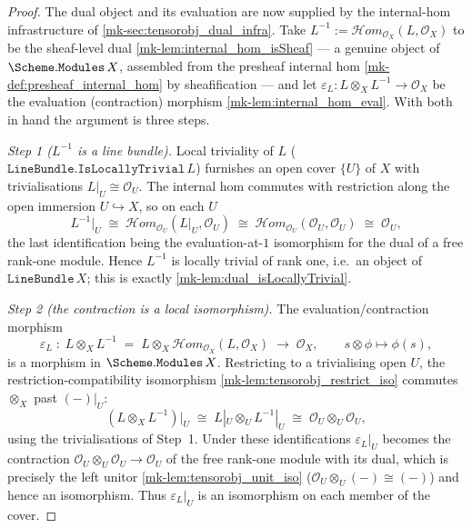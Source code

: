 \begin{proof}
  The dual object and its evaluation are now supplied by the internal-hom
  infrastructure of \ref{mk-sec:tensorobj_dual_infra}. Take
  \(L^{-1} := \mathcal{H}om_{\mathcal{O}_X}(L, \mathcal{O}_X)\) to be the
  sheaf-level dual \ref{mk-lem:internal_hom_isSheaf} --- a genuine object of
  \(\Scheme.\mathtt{Modules}\,X\), assembled from the presheaf internal hom
  \ref{mk-def:presheaf_internal_hom} by sheafification --- and let
  \(\varepsilon_L : L \otimes_X L^{-1} \to \mathcal{O}_X\) be the evaluation
  (contraction) morphism \ref{mk-lem:internal_hom_eval}. With both in hand the
  argument is three steps.

  \emph{Step 1 (\(L^{-1}\) is a line bundle).} Local triviality of \(L\)
  (\(\mathtt{LineBundle.IsLocallyTrivial}\,L\)) furnishes an open cover \(\{U\}\) of
  \(X\) with trivialisations \(L|_U \cong \mathcal{O}_U\). The internal hom commutes
  with restriction along the open immersion \(U \hookrightarrow X\), so on each \(U\)
  \[
    L^{-1}\big|_U \;\cong\; \mathcal{H}om_{\mathcal{O}_U}(L|_U, \mathcal{O}_U)
                 \;\cong\; \mathcal{H}om_{\mathcal{O}_U}(\mathcal{O}_U, \mathcal{O}_U)
                 \;\cong\; \mathcal{O}_U ,
  \]
  the last identification being the evaluation-at-\(1\) isomorphism for the dual of a
  free rank-one module. Hence \(L^{-1}\) is locally trivial of rank one, i.e.\ an
  object of \(\texttt{LineBundle}\,X\); this is exactly
  \ref{mk-lem:dual_isLocallyTrivial}.

  \emph{Step 2 (the contraction is a local isomorphism).} The evaluation/contraction
  morphism
  \[
    \varepsilon_L \;\colon\; L \otimes_X L^{-1}
      \;=\; L \otimes_X \mathcal{H}om_{\mathcal{O}_X}(L, \mathcal{O}_X)
      \;\longrightarrow\; \mathcal{O}_X,
    \qquad s \otimes \phi \longmapsto \phi(s),
  \]
  is a morphism in \(\Scheme.\mathtt{Modules}\,X\). Restricting to a trivialising
  open \(U\), the restriction-compatibility isomorphism \ref{mk-lem:tensorobj_restrict_iso}
  commutes \(\otimes_X\) past \((-)|_U\):
  \[
    (L \otimes_X L^{-1})\big|_U \;\cong\; L|_U \otimes_U L^{-1}|_U
      \;\cong\; \mathcal{O}_U \otimes_U \mathcal{O}_U ,
  \]
  using the trivialisations of Step~1. Under these identifications \(\varepsilon_L|_U\)
  becomes the contraction \(\mathcal{O}_U \otimes_U \mathcal{O}_U \to \mathcal{O}_U\) of
  the free rank-one module with its dual, which is precisely the left unitor
  \ref{mk-lem:tensorobj_unit_iso} (\(\mathcal{O}_U \otimes_U (-) \cong (-)\)) and hence an
  isomorphism. Thus \(\varepsilon_L|_U\) is an isomorphism on each member of the cover.


\end{proof}
